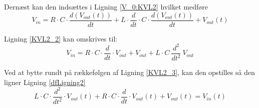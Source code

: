 Dernæst kan den indsættes i Ligning \ref{V_0:KVL2} hvilket medføre 
\begin{equation}
 V_{in}= R \cdot C \cdot \frac{d(V_{out}(t))}{dt} + L\cdot \dfrac{d}{dt} \cdot C\cdot \dfrac{d(V_{out}(t))}{dt} + V_{out}(t)
 \label{KVL2_2}
\end{equation}

Ligning \ref{KVL2_2} kan omskrives til:
\begin{equation}
	V_{in} = R\cdot C\cdot \dfrac{d}{dt}\cdot V_{out}+V_{out}+L\cdot C\ \dfrac{d^{2}}{dt^{2}}\ V_{out}
	\label{KVL2_3}
\end{equation}

\newpage

Ved at bytte rundt på rækkefølgen af Ligning \ref{KVL2_3}, kan den opstilles så den ligner Ligning \ref{dfLigning2}
\begin{equation}
	L\cdot C\cdot \dfrac{d^{2}}{dt^{2}}\cdot V_{out}  \left(t\right) +R\cdot C\cdot \dfrac{d}{dt}\cdot V_{out}  \left(t\right) +V_{out}  \left(t\right)  = V_{in}  \left(t\right)
	\label{KVL2_done} 
\end{equation}






